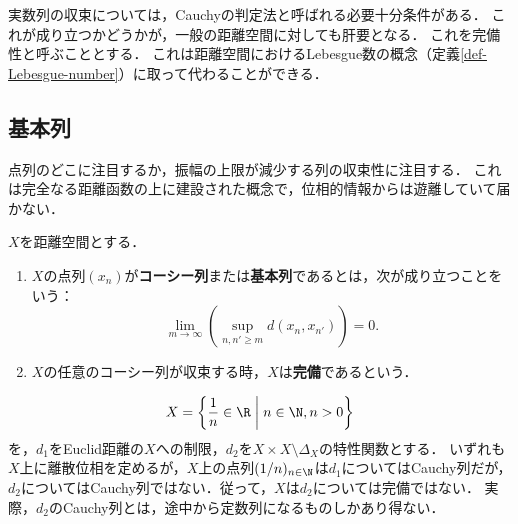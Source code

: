 \documentclass[uplatex,dvipdfmx]{jsreport}
\begin{document}
\begin{tcolorbox}[colframe=ForestGreen, colback=ForestGreen!10!white, breakable ,colbacktitle=ForestGreen!40!white, coltitle=black,fonttitle=\bfseries\sffamily
    ,title=点列という新たな武器を使って完備性というメルクマールを建てる]
    実数列の収束については，Cauchyの判定法と呼ばれる必要十分条件がある．
    これが成り立つかどうかが，一般の距離空間に対しても肝要となる．
    これを完備性と呼ぶこととする．
    これは距離空間におけるLebesgue数の概念（定義\ref{def-Lebesgue-number}）に取って代わることができる．
\end{tcolorbox}

\subsection{基本列}

\begin{tcolorbox}[colframe=ForestGreen, colback=ForestGreen!10!white, breakable ,colbacktitle=ForestGreen!40!white, coltitle=black,fonttitle=\bfseries\sffamily
    ,title=完備性というメルクマール]
    点列のどこに注目するか，振幅の上限が減少する列の収束性に注目する．
    これは完全なる距離函数の上に建設された概念で，位相的情報からは遊離していて届かない．
\end{tcolorbox}

\begin{definition}
    $X$を距離空間とする．
    \begin{enumerate}
        \item $X$の点列$(x_n)$が\textbf{コーシー列}または\textbf{基本列}であるとは，次が成り立つことをいう：
        \[ \lim_{m\to\infty}\left(\sup_{n,n'\ge m}d(x_n,x_{n'})\right)=0. \]
        \item $X$の任意のコーシー列が収束する時，$X$は\textbf{完備}であるという．
    \end{enumerate}
\end{definition}

\begin{example}[完備性は位相情報からは定まらない]
    \[X=\left\{\frac{1}{n}\in\R\;\middle|\;n\in\N,n>0\right\}\]
    を，$d_1$をEuclid距離の$X$への制限，$d_2$を$X\times X\setminus\Delta_X$の特性関数とする．
    いずれも$X$上に離散位相を定めるが，$X$上の点列$(1/n)_{n\in\N}$は$d_1$についてはCauchy列だが，$d_2$についてはCauchy列ではない．従って，$X$は$d_2$については完備ではない．
    実際，$d_2$のCauchy列とは，途中から定数列になるものしかあり得ない．
\end{example}
\end{document}
